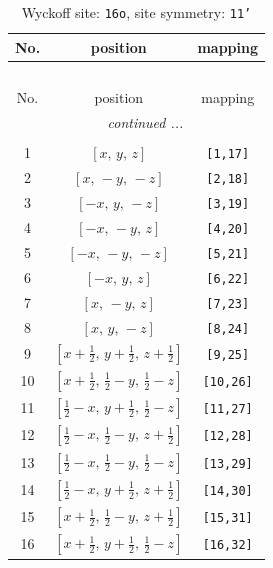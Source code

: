 \documentclass[fleqn,8pt]{jsarticle}
\begin{document}
\begin{longtable}{ccc}
\caption{Wyckoff site: {\tt 16o}, site symmetry: {\tt 11'}}
 \\
 \hline \hline
No. & position & mapping \\ \hline \endfirsthead

\multicolumn{2}{l}{\tablename\ \thetable{}} \\
 \hline \hline
No. & position & mapping \\ \hline \endhead

 \hline \hline
\multicolumn{2}{r}{\footnotesize\it continued ...} \\ \endfoot

 \hline \hline
\multicolumn{2}{r}{} \\ \endlastfoot

1 & $\left[ x,\, y,\, z \right]$ & {\tt [1,17]} \\ \hline
2 & $\left[ x,\, - y,\, - z \right]$ & {\tt [2,18]} \\ \hline
3 & $\left[ - x,\, y,\, - z \right]$ & {\tt [3,19]} \\ \hline
4 & $\left[ - x,\, - y,\, z \right]$ & {\tt [4,20]} \\ \hline
5 & $\left[ - x,\, - y,\, - z \right]$ & {\tt [5,21]} \\ \hline
6 & $\left[ - x,\, y,\, z \right]$ & {\tt [6,22]} \\ \hline
7 & $\left[ x,\, - y,\, z \right]$ & {\tt [7,23]} \\ \hline
8 & $\left[ x,\, y,\, - z \right]$ & {\tt [8,24]} \\ \hline
9 & $\left[ x + \frac{1}{2},\, y + \frac{1}{2},\, z + \frac{1}{2} \right]$ & {\tt [9,25]} \\ \hline
10 & $\left[ x + \frac{1}{2},\, \frac{1}{2} - y,\, \frac{1}{2} - z \right]$ & {\tt [10,26]} \\ \hline
11 & $\left[ \frac{1}{2} - x,\, y + \frac{1}{2},\, \frac{1}{2} - z \right]$ & {\tt [11,27]} \\ \hline
12 & $\left[ \frac{1}{2} - x,\, \frac{1}{2} - y,\, z + \frac{1}{2} \right]$ & {\tt [12,28]} \\ \hline
13 & $\left[ \frac{1}{2} - x,\, \frac{1}{2} - y,\, \frac{1}{2} - z \right]$ & {\tt [13,29]} \\ \hline
14 & $\left[ \frac{1}{2} - x,\, y + \frac{1}{2},\, z + \frac{1}{2} \right]$ & {\tt [14,30]} \\ \hline
15 & $\left[ x + \frac{1}{2},\, \frac{1}{2} - y,\, z + \frac{1}{2} \right]$ & {\tt [15,31]} \\ \hline
16 & $\left[ x + \frac{1}{2},\, y + \frac{1}{2},\, \frac{1}{2} - z \right]$ & {\tt [16,32]} \\
\end{longtable}
\end{document}
